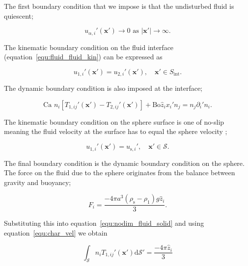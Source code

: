 \documentclass[12pt]{article}
\begin{document}
The first boundary condition that we impose is that the undisturbed fluid is quiescent;

\begin{equation}
\label{equ:BC_inf}
u_{\alpha, i}'(\boldsymbol{x'}) \to 0 \text{ as } |\boldsymbol{x'}| \to \infty.
\end{equation}

The kinematic boundary condition on the fluid interface (equation~\ref{equ:fluid_fluid_kin}) can be expressed as  

\begin{equation}
\label{equ:BC_kin_int_nodim}
u_{1,i}'(\boldsymbol{x'}) = u_{2,i}'(\boldsymbol{x'}), \quad \boldsymbol{x'} \in S_{\text{int}}.
\end{equation}

The dynamic boundary condition is also imposed at the interface;

\begin{equation}
\label{equ:BC_dyn_int}
\text{Ca } n_{i} [T_{1, ij}'(\boldsymbol{x'}) - T_{2,ij}'(\boldsymbol{x'})] + \text{Bo} \hat{z}_{i} x_{i}' n_{j} = n_{j} \partial_{i}' n_{i}.
\end{equation}

The kinematic boundary condition on the sphere surface is one of no-slip meaning the fluid velocity at the surface has to equal the sphere velocity ;

\begin{equation}
\label{equ:BC_kin_spere}
u_{1,i}'(\boldsymbol{x'}) = u_{\text{s},i}', \quad \boldsymbol{x'} \in \mathcal{S}.
\end{equation}

The final boundary condition is the dynamic boundary condition on the sphere. The force on the fluid due to the sphere originates from the balance between gravity and buoyancy;

\begin{equation}
\label{equ:sphere_force}
F_{i} = \frac{- 4 \pi a^{3} (\rho_{\text{s}} - \rho_{1}) g \hat{z}_{i}}{3}.
\end{equation}

Substituting this into equation~\ref{equ:nodim_fluid_solid} and using equation~\ref{equ:char_vel} we obtain

\begin{equation}
\label{equ:BC_dyn_sphere}
\int_{\mathcal{S}} n_{i} T_{1, ij}'(\boldsymbol{x'}) \mathrm{d} \mathcal{S}' = \frac{-4 \pi \hat{z}_{i}}{3}
\end{equation}
\end{document}
